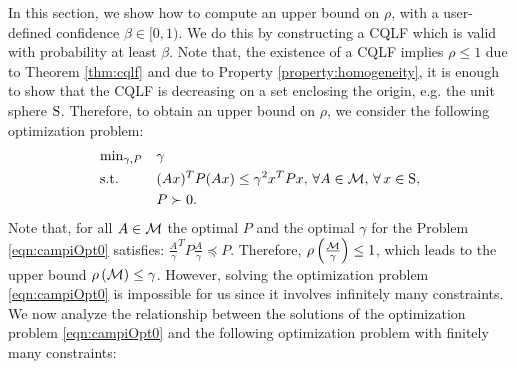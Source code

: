 In this section, we show how to compute an upper bound on $\rho$, with a user-defined confidence $\beta \in [0, 1)$. We do this by constructing a CQLF which is valid with probability at least $\beta$. Note that, the existence of a CQLF implies $\rho \leq 1$ due to Theorem \ref{thm:cqlf} and due to Property \ref{property:homogeneity}, it is enough to show that the CQLF is decreasing on a set enclosing the origin, e.g. the unit sphere $\text{S}$. Therefore, to obtain an upper bound on $\rho$, we consider the following optimization problem:
\begin{equation}\label{eqn:campiOpt0}
\begin{aligned}
& \text{min}_{\gamma, P} & & \gamma \\
& \text{s.t.} 
&  & (Ax)^TP(Ax) \leq \gamma^2 x^TPx,\,\forall A \in \mathcal{M}, \,\forall\, x \in \text{S},\\
& && P \succ 0. \\
\end{aligned}
\end{equation}
Note that, for all $A \in \mathcal{M}$ the optimal $P$ and the optimal $\gamma$ for the Problem \eqref{eqn:campiOpt0} satisfies: $\frac{A}{\gamma}^TP\frac{A}{\gamma} \preceq P$. Therefore, $\rho\left(\frac{\mathcal{M}}{\gamma}\right) \leq 1$, which leads to the upper bound $\rho\left(\mathcal{M} \right) \leq \gamma$. However, solving the optimization problem \eqref{eqn:campiOpt0} is impossible for us since it involves infinitely many constraints.
We now analyze the relationship between the solutions of the optimization problem \eqref{eqn:campiOpt0} and the following optimization problem with finitely many constraints:
